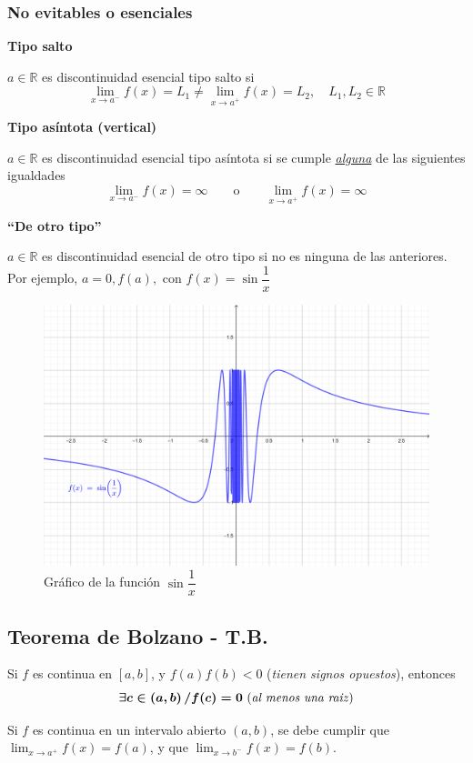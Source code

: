 \documentclass[11pt,titlepage]{article}
\newcommand{\commLim}[2]{\lim_{#1 \to #2}}
\newcommand{\littleTitle}[1]{
	\noindent \ignorespaces
	\small \textbf{#1} \normalsize
	\ignorespaces \ignorespacesafterend
}
\newcommand{\comillas}[1]{``#1''}
\begin{document}
\subsubsection{No evitables o esenciales}

\littleTitle{Tipo salto}\par
$a \in \mathbb{R}$ es discontinuidad esencial tipo salto si
\begin{equation*}
	\commLim{x}{a^{-}} f(x) = L_1 \neq \commLim{x}{a^{+}} f(x) = L_2, \quad L_1, L_2 \in \mathbb{R}
\end{equation*}

\littleTitle{Tipo asíntota (vertical)}\par
$a \in \mathbb{R}$ es discontinuidad esencial tipo asíntota si se cumple \underline{\emph{alguna}} de las siguientes igualdades
\begin{equation*}
	\commLim{x}{a^{-}} f(x) = \infty \qquad \text{o} \qquad \commLim{x}{a^{+}} f(x) = \infty
\end{equation*}

\littleTitle{\comillas{De otro tipo}}\par
$a \in \mathbb{R}$ es discontinuidad esencial de otro tipo si no es ninguna de las anteriores. Por ejemplo, $a = 0, f(a), \text{ con } f(x) = \sin \dfrac{1}{x}$
\begin{figure}[htb!]
	\centering 
	\includegraphics[scale=1.5]{discontinuidad_otro_tipo.png}
	\caption{Gráfico de la función $\sin \dfrac{1}{x}$}
	\label{fig:discontinuidad_otro_tipo}
\end{figure}

\pagebreak

\subsection{Teorema de Bolzano - T.B.} \label{uso_bolzano}
\begin{commBoxy}
	Si $f$ es continua en $[a,b]$, y $f(a)f(b) < 0$ (\emph{tienen signos opuestos}), entonces 
	\begin{equation}
		\boldsymbol{\exists c \in \left(a,b\right) / f(c) = 0} \text{ (\emph{al menos una raiz})}
	\end{equation}
\end{commBoxy}
Si $f$ es continua en un intervalo abierto $\left(a,b\right)$, se debe cumplir que $\commLim{x}{a^{+}} f(x) = f(a)$, y que $\commLim{x}{b^{-}} f(x) = f(b).$
\end{document}

